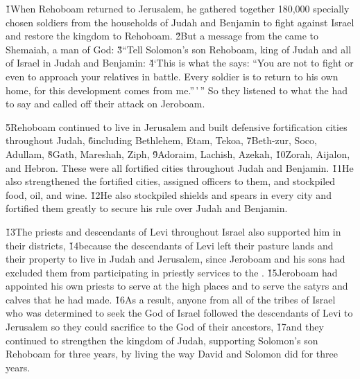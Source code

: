 \v{1}When Rehoboam returned to Jerusalem, he gathered together 180,000 specially chosen soldiers from the households of Judah and Benjamin to fight against Israel and restore the kingdom to Rehoboam. \v{2}But a message from the  came to Shemaiah, a man of God: \v{3}``Tell Solomon's son Rehoboam, king of Judah and all of Israel in Judah and Benjamin: \v{4}`This is what the  says: ``You are not to fight or even to approach your relatives in battle. Every soldier is to return to his own home, for this development comes from me.''\,'\,'' So they listened to what the  had to say and called off their attack on Jeroboam.

\v{5}Rehoboam continued to live in Jerusalem and built defensive fortification cities throughout Judah, \v{6}including Bethlehem, Etam, Tekoa, \v{7}Beth-zur, Soco, Adullam, \v{8}Gath, Mareshah, Ziph, \v{9}Adoraim, Lachish, Azekah, \v{10}Zorah, Aijalon, and Hebron. These were all fortified cities throughout Judah and Benjamin. \v{11}He also strengthened the fortified cities, assigned officers to them, and stockpiled food, oil, and wine. \v{12}He also stockpiled shields and spears in every city and fortified them greatly to secure his rule over Judah and Benjamin.

\v{13}The priests and descendants of Levi throughout Israel also supported him in their districts, \v{14}because the descendants of Levi left their pasture lands and their property to live in Judah and Jerusalem, since Jeroboam and his sons had excluded them from participating in priestly services to the . \v{15}Jeroboam had appointed his own priests to serve at the high places and to serve the satyrs and calves that he had made. \v{16}As a result, anyone from all of the tribes of Israel who was determined to seek the  God of Israel followed the descendants of Levi to Jerusalem so they could sacrifice to the  God of their ancestors, \v{17}and they continued to strengthen the kingdom of Judah, supporting Solomon's son Rehoboam for three years, by living the way David and Solomon did for three years.

